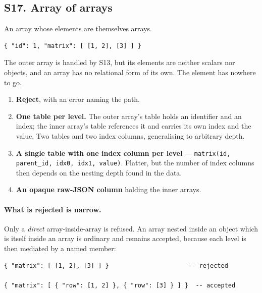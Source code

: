 \subsection*{S17. Array of arrays}

An array whose elements are themselves arrays.

\begin{lstlisting}[style=json]
{ "id": 1, "matrix": [ [1, 2], [3] ] }
\end{lstlisting}

The outer array is handled by S13, but its elements are neither scalars nor
objects, and an array has no relational form of its own. The element has
nowhere to go.

\options
\begin{enumerate}[label=\textbf{(\alph*)}]
  \item \textbf{Reject}, with an error naming the path. \selected
  \item \textbf{One table per level.} The outer array's table holds an
        identifier and an index; the inner array's table references it and
        carries its own index and the value. Two tables and two index columns,
        generalising to arbitrary depth.
  \item \textbf{A single table with one index column per level} ---
        \texttt{matrix(id, parent\_id, idx0, idx1, value)}. Flatter, but the
        number of index columns then depends on the nesting depth found in the
        data.
  \item \textbf{An opaque raw-JSON column} holding the inner arrays.
\end{enumerate}


\paragraph{What is rejected is narrow.}
Only a \emph{direct} array-inside-array is refused. An array nested inside an
object which is itself inside an array is ordinary and remains accepted,
because each level is then mediated by a named member:

\begin{lstlisting}[style=json]
{ "matrix": [ [1, 2], [3] ] }                      -- rejected

{ "matrix": [ { "row": [1, 2] }, { "row": [3] } ] }  -- accepted
\end{lstlisting}

